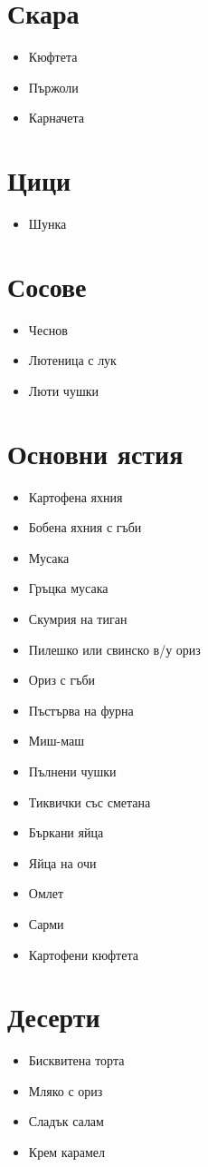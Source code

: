 \documentclass{article}
\begin{document}
\begin{multicols}{2}
\section{Скара}
\begin{itemize}
    \item{Кюфтета}
    \item{Пържоли}
    \item{Карначета}
\end{itemize}

\section{Цици}
\begin{itemize}
    \item{Шунка}
\end{itemize}

\section{Сосове}
\begin{itemize}
    \item{Чеснов}
    \item{Лютеница с лук}
    \item{Люти чушки}
\end{itemize}

\section{Основни ястия}
\begin{itemize}
    \item{Картофена яхния}
    \item{Бобена яхния с гъби}
    \item{Мусака}
    \item{Гръцка мусака}
    \item{Скумрия на тиган}
    \item{Пилешко или свинско в/у ориз}
    \item{Ориз с гъби}
    \item{Пъстърва на фурна}
    \item{Миш-маш}
    \item{Пълнени чушки}
    \item{Тиквички със сметана}
    \item{Бъркани яйца}
    \item{Яйца на очи}
    \item{Омлет}
    \item{Сарми}
    \item{Картофени кюфтета}
\end{itemize}

\section{Десерти}
\begin{itemize}
    \item{Бисквитена торта}
    \item{Мляко с ориз}
    \item{Сладък салам}
    \item{Крем карамел}
\end{itemize}
\end{multicols}
\end{document}
